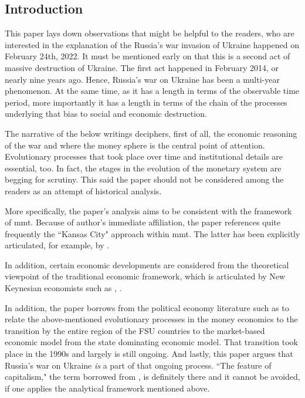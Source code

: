 \newpage

\subsection{Introduction}

This paper lays down observations that might be helpful to the readers,
who are interested in the explanation of the Russia's war invasion of
Ukraine happened on February 24th, 2022. It must be mentioned early on
that this is a second act of massive destruction of Ukraine. The first
act happened in February 2014, or nearly nine years ago. Hence, Russia's
war on Ukraine has been a multi-year phenomenon. At the same time, as it
has a length in terms of the observable time period, more importantly it
has a length in terms of the chain of the processes underlying that bias
to social and economic destruction.

The narrative of the below writings deciphers, first of all, the
economic reasoning of the war and where the money sphere is the central
point of attention. Evolutionary processes that took place over time and
institutional details are essential, too. In fact, the stages in the
evolution of the monetary system are begging for scrutiny. This said the
paper should not be considered among the readers as an attempt of
historical analysis.

More specifically, the paper's analysis aims to be consistent with the
framework of \acf{mmt}. Because of author's immediate
affiliation, the paper references quite frequently the ``Kansas City"
approach within \ac{mmt}. The latter has been explicitly articulated, for
example, by \cite{wray_2019,wray_2020,bell,tcherneva,fullwiler_2009,fullwiler_2022,tymoigne2014,tymoigne_textbook}.

In addition, certain economic developments are considered from the
theoretical viewpoint of the traditional economic framework, which is
articulated by New Keynesian economists such as \cite{guriev_2022},
\cite{itskhoki2022a,itskhoki2022b}.

In addition, the paper borrows from the political economy literature
such as \citep{dharvey} to relate the above-mentioned evolutionary processes
in the money economics to the transition by the entire region of the FSU
countries to the market-based economic model from the state dominating
economic model. That transition took place in the 1990s and largely is
still ongoing. And lastly, this paper argues that Russia's war on
Ukraine \textit{is} a part of that ongoing process. ``The feature of
capitalism," the term borrowed from \citep{dharvey2022}, is definitely there
and it cannot be avoided, if one applies the analytical framework
mentioned above.

